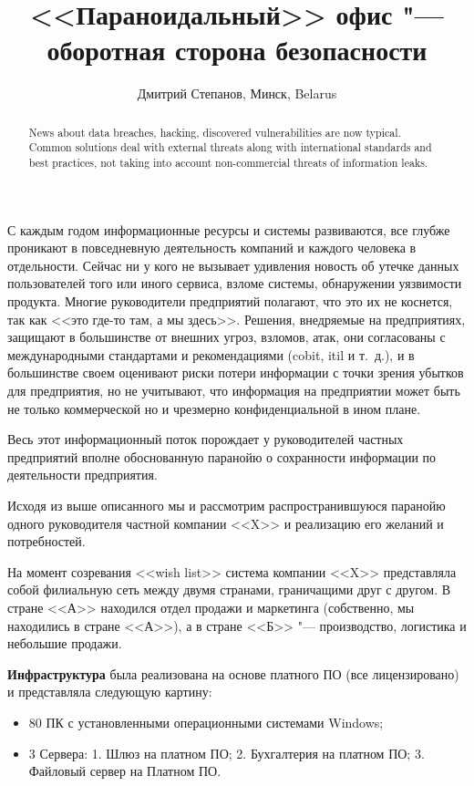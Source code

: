 \documentclass[10pt, a5paper]{article}
\begin{document}
\title{<<Параноидальный>> офис "---  оборотная сторона безопасности}
\author{Дмитрий Степанов, Минск, Belarus}
\maketitle
\begin{abstract}
News about data breaches, hacking, discovered vulnerabilities are now typical. Common solutions deal with external threats along with international standards and best practices, not taking into account non-commercial threats of information leaks.
\end{abstract}
С каждым годом информационные ресурсы и системы развиваются, все глубже проникают в повседневную деятельность компаний и каждого человека в отдельности. Сейчас ни у кого не вызывает удивления новость об утечке данных пользователей того или иного сервиса, взломе системы, обнаружении уязвимости продукта. Многие руководители предприятий полагают, что это их не коснется, так как <<это где-то там, а мы здесь>>. Решения, внедряемые на предприятиях, защищают в большинстве от внешних угроз, взломов, атак, они согласованы с международными стандартами и рекомендациями (cobit, itil и т. д.), и в большинстве своем оценивают риски потери информации с точки зрения  убытков для предприятия, но не учитывают, что информация на предприятии может быть не только коммерческой но и чрезмерно конфиденциальной в ином плане.

Весь этот информационный поток порождает у руководителей частных предприятий вполне обоснованную паранойю о сохранности информации по деятельности предприятия.

Исходя из выше описанного мы и рассмотрим распространившуюся паранойю одного руководителя частной компании <<X>>  и реализацию его желаний и потребностей.

На момент созревания <<wish list>> система компании <<X>> представляла собой филиальную сеть между двумя странами, граничащими друг с другом. В стране <<А>> находился отдел продажи и маркетинга (собственно, мы находились в стране <<А>>), а в стране <<Б>> "--- производство, логистика и небольшие продажи.

\textbf{Инфраструктура} была реализована на основе платного ПО (все лицензировано) и представляла следующую картину:

\begin{itemize}
  \item 80 ПК с установленными операционными системами Windows;
  \item 3 Сервера: 1. Шлюз на платном ПО; 2. Бухгалтерия на платном ПО; 3. Файловый сервер на Платном ПО.
\end{itemize}
\end{document}
